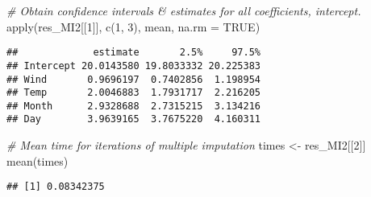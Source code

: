 \documentclass[
]{article}
\newenvironment{Shaded}{\begin{snugshade}}{\end{snugshade}}
\newcommand{\AttributeTok}[1]{\textcolor[rgb]{0.77,0.63,0.00}{#1}}
\newcommand{\CommentTok}[1]{\textcolor[rgb]{0.56,0.35,0.01}{\textit{#1}}}
\newcommand{\ConstantTok}[1]{\textcolor[rgb]{0.00,0.00,0.00}{#1}}
\newcommand{\DecValTok}[1]{\textcolor[rgb]{0.00,0.00,0.81}{#1}}
\newcommand{\FunctionTok}[1]{\textcolor[rgb]{0.00,0.00,0.00}{#1}}
\newcommand{\NormalTok}[1]{#1}
\newcommand{\OtherTok}[1]{\textcolor[rgb]{0.56,0.35,0.01}{#1}}
\begin{document}
\begin{Shaded}
\begin{Highlighting}[]
\CommentTok{\# Obtain confidence intervals \& estimates for all coefficients, intercept.}
\FunctionTok{apply}\NormalTok{(res\_MI2[[}\DecValTok{1}\NormalTok{]], }\FunctionTok{c}\NormalTok{(}\DecValTok{1}\NormalTok{, }\DecValTok{3}\NormalTok{), mean, }\AttributeTok{na.rm =} \ConstantTok{TRUE}\NormalTok{)}
\end{Highlighting}
\end{Shaded}

\begin{verbatim}
##             estimate       2.5%     97.5%
## Intercept 20.0143580 19.8033332 20.225383
## Wind       0.9696197  0.7402856  1.198954
## Temp       2.0046883  1.7931717  2.216205
## Month      2.9328688  2.7315215  3.134216
## Day        3.9639165  3.7675220  4.160311
\end{verbatim}

\begin{Shaded}
\begin{Highlighting}[]
\CommentTok{\# Mean time for iterations of multiple imputation}
\NormalTok{times }\OtherTok{\textless{}{-}}\NormalTok{ res\_MI2[[}\DecValTok{2}\NormalTok{]]}
\FunctionTok{mean}\NormalTok{(times)}
\end{Highlighting}
\end{Shaded}

\begin{verbatim}
## [1] 0.08342375
\end{verbatim}
\end{document}
